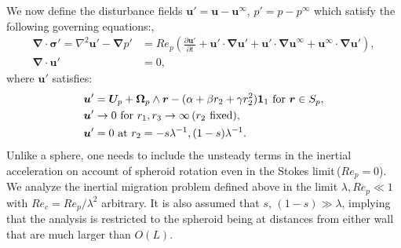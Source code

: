 \documentclass{jfm}
\begin{document}
We now define the disturbance fields $\bm{u}'=\bm{u}-\bm{u}^\infty$, $p'=p-p^\infty$ which satisfy the following governing equations:,
\begin{subequations}
	\begin{align}
	\bm{\nabla} \cdot \bm{\sigma}' = \nabla^2 \bm{u}'-\bm{\nabla} p' &=Re_p\left(\frac{\partial\bm{u}'}{\partial t}+\bm{u}'\cdot\bm{\nabla u}'+\bm{u}'\cdot\bm{\nabla u}^\infty+\bm{u}^\infty\cdot\bm{\nabla u}'\right),\\
	\bm{\nabla}\cdot \bm{u}'&=0,
	\end{align} \label{eq:Ch3NS2}
\end{subequations}
where $\bm{u}'$ satisfies:
\begin{subequations}
	\begin{align}	\bm{u}'&=\bm{U}_p+\bm{\Omega}_p\wedge \bm{r}-(\alpha+\beta r_2 +\gamma r_2^2)\bm{1}_1 \text{ for } \bm{r}\in S_p,\\
	\bm{u}'&\rightarrow 0 \text{ for } r_1,r_3\rightarrow \infty\,(r_2\hspace*{0.05in}\text{fixed}),\\
	\bm{u}'&=0 \text{ at } r_2=-s\lambda^{-1}, (1-s)\lambda^{-1}.
	\end{align} \label{eq:Ch3BC2} 
\end{subequations}
Unlike a sphere, one needs to include the unsteady terms in the inertial acceleration on account of spheroid rotation even in the Stokes limit\,($Re_p = 0$). We analyze the inertial migration problem defined above in the limit $\lambda, Re_p\ll1$ with $Re_c=Re_p/\lambda^2$ arbitrary. It is also assumed that $s,\,(1-s)\gg\lambda$, implying that the analysis is restricted to the spheroid being at distances from either wall that are much larger than $O(L)$.
\end{document}
